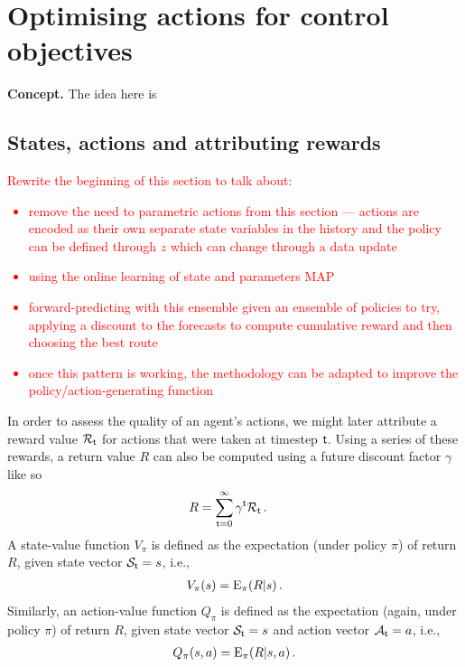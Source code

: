 \chapter{\sffamily Optimising actions for control objectives}

{\bfseries\sffamily Concept.} The idea here is 

\section{\sffamily States, actions and attributing rewards}

\textcolor{red}{Rewrite the beginning of this section to talk about:
\begin{itemize}
\item{remove the need to parametric actions from this section --- actions are encoded as their own separate state variables in the history and the policy can be defined through $z$ which can change through a data update}
\item{using the online learning of state and parameters MAP}
\item{forward-predicting with this ensemble given an ensemble of policies to try, applying a discount to the forecasts to compute cumulative reward and then choosing the best route}
\item{once this pattern is working, the methodology can be adapted to improve the policy/action-generating function}    
\end{itemize}
}

In order to assess the quality of an agent's actions, we might later attribute a reward value ${\cal R}_{{\sf t}}$ for actions that were taken at timestep ${\sf t}$. Using a series of these rewards, a return value $R$ can also be computed using a future discount factor $\gamma$ like so 
\begin{align}
R &= \sum_{{\sf t}=0}^\infty \gamma^{\sf t}{\cal R}_{\sf t} \,.
\end{align}
A state-value function $V_\pi$ is defined as the expectation (under policy $\pi$) of return $R$, given state vector ${\cal S}_{\sf t}=s$, i.e.,
\begin{align}
V_\pi (s) = {\rm E}_\pi (R\vert s) \,.
\end{align}
Similarly, an action-value function $Q_\pi$ is defined as the expectation (again, under policy $\pi$) of return $R$, given state vector ${\cal S}_{\sf t}=s$ and action vector ${\cal A}_{\sf t}=a$, i.e.,
\begin{align}
Q_\pi (s,a) = {\rm E}_\pi (R\vert s,a) \,.
\end{align}

